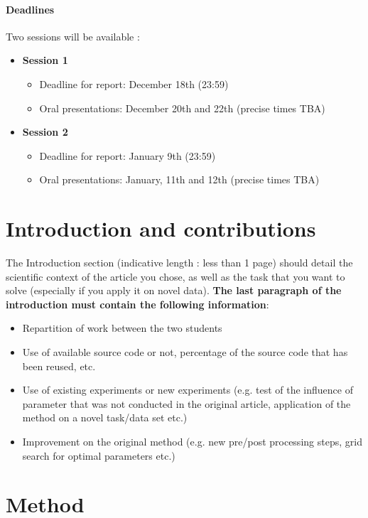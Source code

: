 \documentclass[11pt]{article}
\begin{document}
\paragraph{Deadlines}
Two sessions will be available :
\begin{itemize}
 \item \textbf{Session 1}
 \begin{itemize}
  \item Deadline for report: December 18th (23:59)
  \item Oral presentations: December 20th and 22th (precise times TBA)
 \end{itemize}
\item \textbf{Session 2}
 \begin{itemize}
  \item Deadline for report: January 9th (23:59)
  \item Oral presentations: January, 11th and 12th (precise times TBA)
 \end{itemize}
\end{itemize}

\section{Introduction and contributions}

The Introduction section (indicative length : less than 1 page) should detail the scientific context of the article you chose, as well as the task that you want to solve (especially if you apply it on novel data). \textbf{The last paragraph of the introduction must contain the following information}:
\begin{itemize}
    \item Repartition of work between the two students
    \item Use of available source code or not, percentage of the source code that has been reused, etc.
    \item Use of existing experiments or new experiments (e.g. test of the influence of parameter that was not conducted in the original article, application of the method on a novel task/data set etc.)
    \item Improvement on the original method (e.g. new pre/post processing steps, grid search for optimal parameters etc.)
\end{itemize}

\section{Method}
\end{document}
